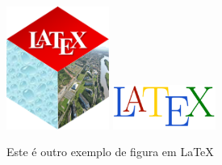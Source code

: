 \begin{figure}[H]
	\begin{center}
		\includegraphics[width=0.3\textwidth]{latex2.png}
		\includegraphics[angle=45,width=0.3\textwidth]{latex3.png}		
		\caption{Este \'{e} outro exemplo de figura em \LaTeX}
		\label{foto2}
	\end{center}
\end{figure}



